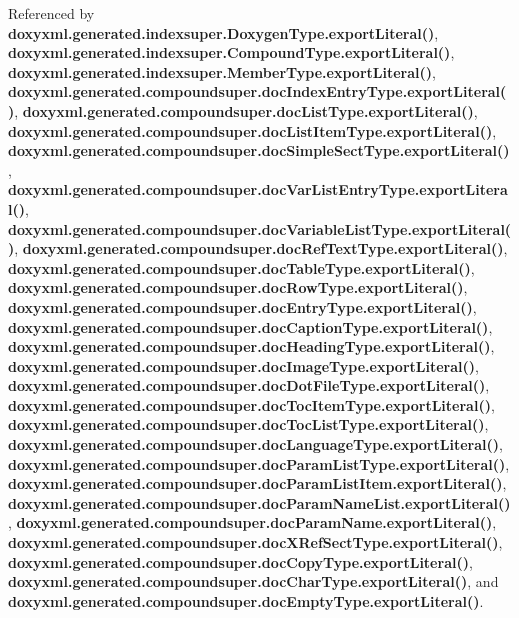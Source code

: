 Referenced by {\bf doxyxml.\+generated.\+indexsuper.\+Doxygen\+Type.\+export\+Literal()}, {\bf doxyxml.\+generated.\+indexsuper.\+Compound\+Type.\+export\+Literal()}, {\bf doxyxml.\+generated.\+indexsuper.\+Member\+Type.\+export\+Literal()}, {\bf doxyxml.\+generated.\+compoundsuper.\+doc\+Index\+Entry\+Type.\+export\+Literal()}, {\bf doxyxml.\+generated.\+compoundsuper.\+doc\+List\+Type.\+export\+Literal()}, {\bf doxyxml.\+generated.\+compoundsuper.\+doc\+List\+Item\+Type.\+export\+Literal()}, {\bf doxyxml.\+generated.\+compoundsuper.\+doc\+Simple\+Sect\+Type.\+export\+Literal()}, {\bf doxyxml.\+generated.\+compoundsuper.\+doc\+Var\+List\+Entry\+Type.\+export\+Literal()}, {\bf doxyxml.\+generated.\+compoundsuper.\+doc\+Variable\+List\+Type.\+export\+Literal()}, {\bf doxyxml.\+generated.\+compoundsuper.\+doc\+Ref\+Text\+Type.\+export\+Literal()}, {\bf doxyxml.\+generated.\+compoundsuper.\+doc\+Table\+Type.\+export\+Literal()}, {\bf doxyxml.\+generated.\+compoundsuper.\+doc\+Row\+Type.\+export\+Literal()}, {\bf doxyxml.\+generated.\+compoundsuper.\+doc\+Entry\+Type.\+export\+Literal()}, {\bf doxyxml.\+generated.\+compoundsuper.\+doc\+Caption\+Type.\+export\+Literal()}, {\bf doxyxml.\+generated.\+compoundsuper.\+doc\+Heading\+Type.\+export\+Literal()}, {\bf doxyxml.\+generated.\+compoundsuper.\+doc\+Image\+Type.\+export\+Literal()}, {\bf doxyxml.\+generated.\+compoundsuper.\+doc\+Dot\+File\+Type.\+export\+Literal()}, {\bf doxyxml.\+generated.\+compoundsuper.\+doc\+Toc\+Item\+Type.\+export\+Literal()}, {\bf doxyxml.\+generated.\+compoundsuper.\+doc\+Toc\+List\+Type.\+export\+Literal()}, {\bf doxyxml.\+generated.\+compoundsuper.\+doc\+Language\+Type.\+export\+Literal()}, {\bf doxyxml.\+generated.\+compoundsuper.\+doc\+Param\+List\+Type.\+export\+Literal()}, {\bf doxyxml.\+generated.\+compoundsuper.\+doc\+Param\+List\+Item.\+export\+Literal()}, {\bf doxyxml.\+generated.\+compoundsuper.\+doc\+Param\+Name\+List.\+export\+Literal()}, {\bf doxyxml.\+generated.\+compoundsuper.\+doc\+Param\+Name.\+export\+Literal()}, {\bf doxyxml.\+generated.\+compoundsuper.\+doc\+X\+Ref\+Sect\+Type.\+export\+Literal()}, {\bf doxyxml.\+generated.\+compoundsuper.\+doc\+Copy\+Type.\+export\+Literal()}, {\bf doxyxml.\+generated.\+compoundsuper.\+doc\+Char\+Type.\+export\+Literal()}, and {\bf doxyxml.\+generated.\+compoundsuper.\+doc\+Empty\+Type.\+export\+Literal()}.



